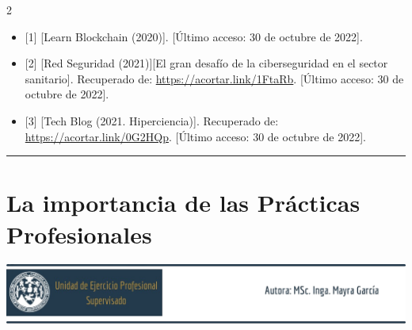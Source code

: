 \documentclass[12pt,spanish,Letterpaper,openany]{book}
\newcommand{\HRule}{\begin{center}\rule{0.5\linewidth}{0.2mm}\end{center}}
\begin{document}
\begin {multicols}{2}
\begin{itemize}
\item
  {[}1{]} {[}Learn Blockchain (2020){]}. {[}Último acceso: 30 de octubre de 2022{]}.
\item
  {[}2{]} {[}Red Seguridad (2021){]}{[}El gran desafío de la ciberseguridad en el sector sanitario{]}. Recuperado de: \url{https://acortar.link/1FtaRb}. {[}Último acceso: 30 de octubre de 2022{]}.
\item
  {[}3{]} {[}Tech Blog (2021. Hiperciencia){]}. Recuperado de: \url{https://acortar.link/0G2HQp}. {[}Último acceso: 30 de octubre de 2022{]}.
\end{itemize}

\end {multicols}
\medskip
\HRule
\medskip

\hypertarget{mayra}{%
\chapter{La importancia de las Prácticas Profesionales}\label{mayra}}

\begin{center}\includegraphics[width=1\linewidth]{images/MscMayra_02} \end{center}
\end{document}
